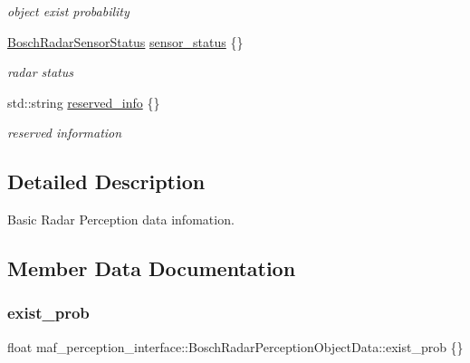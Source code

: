 \begin{DoxyCompactItemize}
\begin{DoxyCompactList}\small\item\em object exist probability \end{DoxyCompactList}\item 
\hyperlink{structmaf__perception__interface_1_1BoschRadarSensorStatus}{Bosch\+Radar\+Sensor\+Status} \hyperlink{structmaf__perception__interface_1_1BoschRadarPerceptionObjectData_ad5d5331e647d2e43e4df89c5cbe5ab81}{sensor\+\_\+status} \{\}
\begin{DoxyCompactList}\small\item\em radar status \end{DoxyCompactList}\item 
std\+::string \hyperlink{structmaf__perception__interface_1_1BoschRadarPerceptionObjectData_a302abf2e47e36b6deb7d2ab967448260}{reserved\+\_\+info} \{\}
\begin{DoxyCompactList}\small\item\em reserved information \end{DoxyCompactList}\end{DoxyCompactItemize}


\subsection{Detailed Description}
Basic Radar Perception data infomation. 

\subsection{Member Data Documentation}
\mbox{\label{structmaf__perception__interface_1_1BoschRadarPerceptionObjectData_adc5eb28d6a0eddb331e11ed3dcfa3c34}} 
\subsubsection{\texorpdfstring{exist\+\_\+prob}{exist\_prob}}
{\footnotesize\ttfamily float maf\+\_\+perception\+\_\+interface\+::\+Bosch\+Radar\+Perception\+Object\+Data\+::exist\+\_\+prob \{\}}



